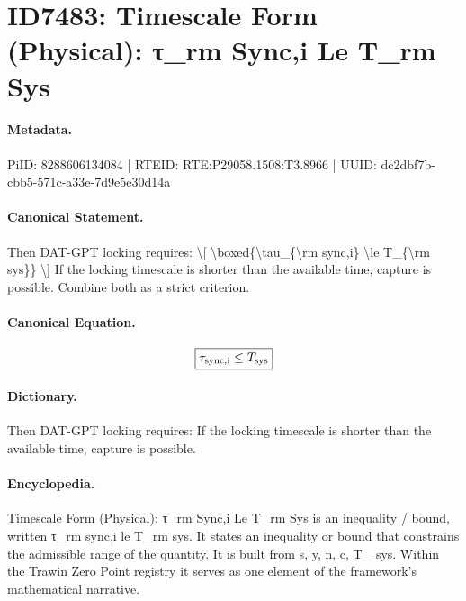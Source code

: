 \section*{ID7483: Timescale Form (Physical): τ\_rm Sync,i Le T\_rm Sys}
\paragraph{Metadata.}
PiID: 8288606134084 | RTEID: RTE:P29058.1508:T3.8966 | UUID: dc2dbf7b-cbb5-571c-a33e-7d9e5e30d14a

\paragraph{Canonical Statement.}
Then DAT-GPT locking requires: \textbackslash{}[ \textbackslash{}boxed\{\textbackslash{}tau\_\{\textbackslash{}rm sync,i\} \textbackslash{}le T\_\{\textbackslash{}rm sys\}\} \textbackslash{}] If the locking timescale is shorter than the available time, capture is possible. Combine both as a strict criterion.

\paragraph{Canonical Equation.}
\[
\boxed{\tau_{\rm sync,i} \le T_{\rm sys}}
\]

\paragraph{Dictionary.}
Then DAT-GPT locking requires: If the locking timescale is shorter than the available time, capture is possible.

\paragraph{Encyclopedia.}
Timescale Form (Physical): τ\_rm Sync,i Le T\_rm Sys is an inequality / bound, written τ\_rm sync,i le T\_rm sys. It states an inequality or bound that constrains the admissible range of the quantity. It is built from s, y, n, c, T\_ sys. Within the Trawin Zero Point registry it serves as one element of the framework's mathematical narrative.

